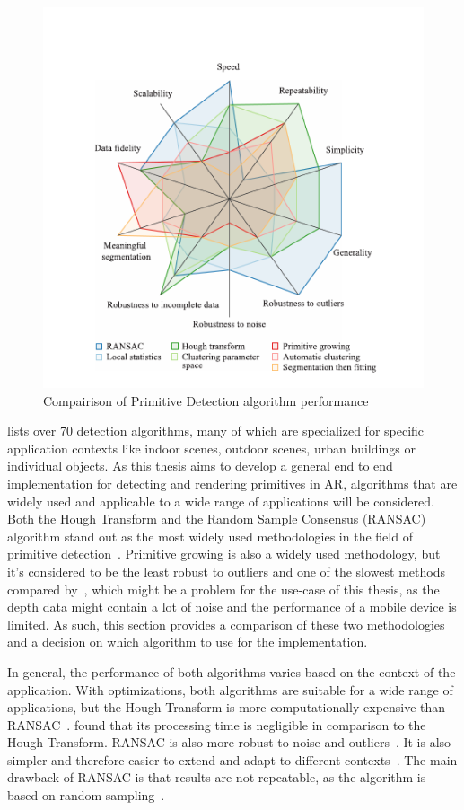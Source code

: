 \begin{figure}[h!]
    \centering
    \includegraphics[width=0.6\linewidth]{images/algos-compairision}
    \caption{Compairison of Primitive Detection algorithm performance~\cite{kaiser_survey_2019}}
    \label{fig:}
\end{figure}


\cite{kaiser_survey_2019} lists over 70 detection algorithms, many of which are specialized for specific application contexts
like indoor scenes, outdoor scenes, urban buildings or individual objects.
As this thesis aims to develop a general end to end implementation for detecting and rendering primitives in AR,
algorithms that are widely used and applicable to a wide range of applications will be considered.
Both the Hough Transform and the Random Sample Consensus (RANSAC) algorithm stand out as the
most widely used methodologies in the field of primitive detection~\parencite{schnabel_efficient_2007}.
Primitive growing is also a widely used methodology, but it's considered to be the least robust to outliers and one of the slowest methods compared by~\parencite{kaiser_survey_2019},
which might be a problem for the use-case of this thesis, as the depth data might contain a lot of noise and the performance of a mobile device is limited.
As such, this section provides a comparison of these two methodologies and a decision on which algorithm to use for the implementation.

In general, the performance of both algorithms varies based on the context of the application.
With optimizations, both algorithms are suitable for a wide range of applications, but
the Hough Transform is more computationally expensive than RANSAC~\parencite{kaiser_survey_2019}.
\cite{tarsha-kurdi_hough-transform_2007} found that its processing time is negligible in comparison to the Hough Transform.
RANSAC is also more robust to noise and outliers~\parencite{kaiser_survey_2019}.
It is also simpler and therefore easier to extend and adapt to different contexts~\parencite{tarsha-kurdi_hough-transform_2007, kaiser_survey_2019}.
The main drawback of RANSAC is that results are not repeatable, as the algorithm is based on random sampling~\parencite{kaiser_survey_2019}.


